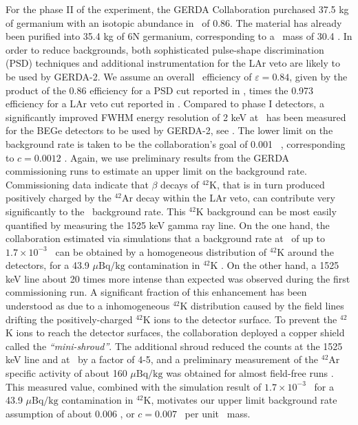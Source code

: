 For the phase II of the experiment, the GERDA Collaboration purchased 37.5 kg of germanium with an isotopic abundance in \GE\ of 0.86. The material has already been purified into 35.4 kg of 6N germanium, corresponding to a \bb\ mass of 30.4 \kgbb. In order to reduce backgrounds, both sophisticated pulse-shape discrimination (PSD) techniques and additional instrumentation for the LAr veto are likely to be used by GERDA-2. We assume an overall \bbonu\ efficiency of $\varepsilon =0.84$, given by the product of the 0.86 efficiency for a PSD cut reported in \cite{Agostini:2010rd}, times the 0.973 efficiency for a LAr veto cut reported in \cite{heisel2011large}. Compared to phase I detectors, a significantly improved FWHM energy resolution of 2 keV at \Qbb\ has been measured for the BEGe detectors to be used by GERDA-2, see \cite{Agostini:2010ke}. The lower limit on the background rate is taken to be the collaboration's goal of 0.001 \ckky\ \cite{Abt:2004yk}, corresponding to $c=0.0012$ \ckkbby. Again, we use preliminary results from the GERDA commissioning runs to estimate an upper limit on the background rate. Commissioning data indicate that $\beta$ decays of $^{42}$K, that is in turn produced positively charged by the $^{42}$Ar decay within the LAr veto, can contribute very significantly to the \Qbb\ background rate. This $^{42}$K background can be most easily quantified by measuring the 1525 keV gamma ray line. On the one hand, the collaboration estimated via simulations that a background rate at \Qbb\ of up to $1.7\times 10^{-3}$ \ckky\ can be obtained by a homogeneous distribution of $^{42}$K around the detectors, for a 43.9 $\mu\text{Bq/kg}$ contamination in $^{42}$K \cite{lehnert2011analysis}. On the other hand, a 1525 keV line about 20 times more intense than expected was observed during the first commissioning run. A significant fraction of this enhancement has been understood as due to a inhomogeneous $^{42}$K distribution caused by the field lines drifting the positively-charged $^{42}$K ions to the detector surface. To prevent the $^{42}$K ions to reach the detector surfaces, the collaboration deployed a copper shield called the \emph{``mini-shroud''}. The additional shroud reduced the counts at the 1525 keV line and at \Qbb\ by a factor of 4-5, and a preliminary measurement of the $^{42}$Ar specific activity of about 160 $\mu\text{Bq/kg}$ was obtained for almost field-free runs \cite{Knopfle:2012zz}. This measured value, combined with the simulation result of $1.7\times 10^{-3}$ \ckky\ for a 43.9 $\mu\text{Bq/kg}$ contamination in $^{42}$K, motivates our upper limit background rate assumption of about 0.006 \ckky, or $c=0.007$ \ckkbby\ per unit \bb\ mass.

